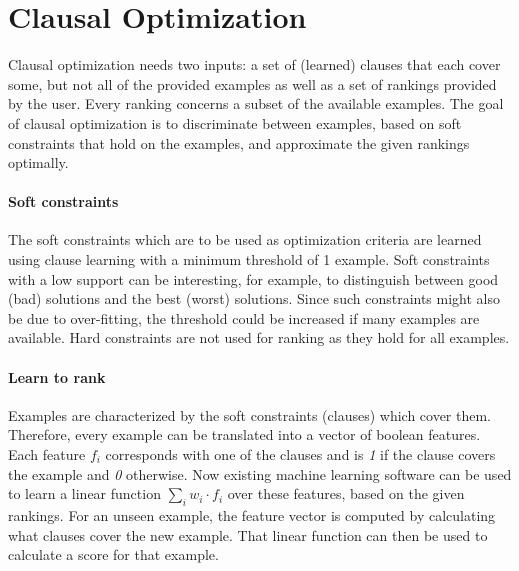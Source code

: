 \section{Clausal Optimization}
\label{sec:clausal_opt_approach}
Clausal optimization needs two inputs: a set of (learned) clauses that each cover some, but not all of the provided examples as well as a set of rankings provided by the user.
Every ranking concerns a subset of the available examples.
The goal of clausal optimization is to discriminate between examples, based on soft constraints that hold on the examples, and approximate the given rankings optimally.

\paragraph{Soft constraints}
The soft constraints which are to be used as optimization criteria are learned using clause learning with a minimum threshold of 1 example.
Soft constraints with a low support can be interesting, for example, to distinguish between good (bad) solutions and the best (worst) solutions.
Since such constraints might also be due to over-fitting, the threshold could be increased if many examples are available.
Hard constraints are not used for ranking as they hold for all examples.

\paragraph{Learn to rank}
Examples are characterized by the soft constraints (clauses) which cover them.
Therefore, every example can be translated into a vector of boolean features.
Each feature $f_i$ corresponds with one of the clauses and is \emph{1} if the clause covers the example and \emph{0} otherwise.
Now existing machine learning software can be used to learn a linear function $\sum_i w_i \cdot f_i$ over these features, based on the given rankings.
For an unseen example, the feature vector is computed by calculating what clauses cover the new example.
That linear function can then be used to calculate a score for that example.

